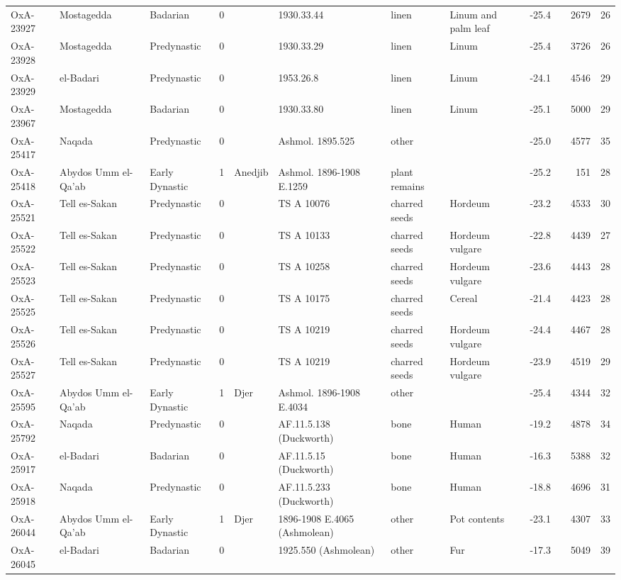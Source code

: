 \documentclass[a4paper,8pt]{article}
\begin{document}
\begin{landscape}
\begin{center}
\begin{longtable}{|l|>{\raggedright}p{20ex}|l|r|l|>{\raggedright}p{25ex}|l|l|r|l|r|r|}
OxA-23927 & Mostagedda & Badarian & 0 &  & 1930.33.44 & linen & Linum and palm leaf & -25.4 &  & 2679 & 26\\
OxA-23928 & Mostagedda & Predynastic & 0 &  & 1930.33.29 & linen & Linum & -25.4 &  & 3726 & 26\\
OxA-23929 & el-Badari & Predynastic & 0 &  & 1953.26.8 & linen & Linum & -24.1 &  & 4546 & 29\\
OxA-23967 & Mostagedda & Badarian & 0 &  & 1930.33.80 & linen & Linum & -25.1 &  & 5000 & 29\\
OxA-25417 & Naqada & Predynastic & 0 &  & Ashmol. 1895.525 & other &  & -25.0 &  & 4577 & 35\\
OxA-25418 & Abydos Umm el-Qa'ab & Early Dynastic & 1 & Anedjib & Ashmol. 1896-1908 E.1259 & plant remains &  & -25.2 &  & 151 & 28\\
OxA-25521 & Tell es-Sakan & Predynastic & 0 &  & TS A 10076 & charred seeds & Hordeum & -23.2 &  & 4533 & 30\\
OxA-25522 & Tell es-Sakan & Predynastic & 0 &  & TS A 10133 & charred seeds & Hordeum vulgare & -22.8 &  & 4439 & 27\\
OxA-25523 & Tell es-Sakan & Predynastic & 0 &  & TS A 10258 & charred seeds & Hordeum vulgare & -23.6 &  & 4443 & 28\\
OxA-25525 & Tell es-Sakan & Predynastic & 0 &  & TS A 10175 & charred seeds & Cereal & -21.4 &  & 4423 & 28\\
OxA-25526 & Tell es-Sakan & Predynastic & 0 &  & TS A 10219 & charred seeds & Hordeum vulgare & -24.4 &  & 4467 & 28\\
OxA-25527 & Tell es-Sakan & Predynastic & 0 &  & TS A 10219 & charred seeds & Hordeum vulgare & -23.9 &  & 4519 & 29\\
OxA-25595 & Abydos Umm el-Qa'ab & Early Dynastic & 1 & Djer & Ashmol. 1896-1908 E.4034 & other &  & -25.4 &  & 4344 & 32\\
OxA-25792 & Naqada & Predynastic & 0 &  & AF.11.5.138 (Duckworth) & bone & Human & -19.2 &  & 4878 & 34\\
OxA-25917 & el-Badari & Badarian & 0 &  & AF.11.5.15 (Duckworth) & bone & Human & -16.3 &  & 5388 & 32\\
OxA-25918 & Naqada & Predynastic & 0 &  & AF.11.5.233 (Duckworth) & bone & Human & -18.8 &  & 4696 & 31\\
OxA-26044 & Abydos Umm el-Qa'ab & Early Dynastic & 1 & Djer & 1896-1908 E.4065 (Ashmolean) & other & Pot contents & -23.1 &  & 4307 & 33\\
OxA-26045 & el-Badari & Badarian & 0 &  & 1925.550 (Ashmolean) & other & Fur & -17.3 &  & 5049 & 39\\

\end{longtable}
\end{center}
\end{landscape}
\end{document}
